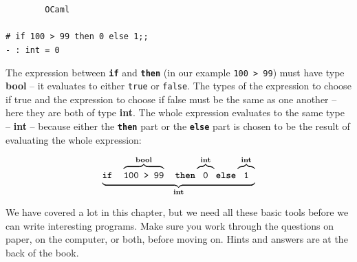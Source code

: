 \documentclass[]{book}
\newcommand{\smspace}{\vspace{4mm}}
\begin{document}
\smspace
\noindent\verb!        OCaml!\\
\noindent\\
\noindent\texttt{\# if 100 > 99 then 0 else 1;;}\\
\noindent\texttt{- :\ int = 0} 
\smspace

\noindent The expression between \texttt{\textbf{if}} and \texttt{\textbf{then}} (in our example \texttt{100 > 99}) must have type \textbf{\textrm{bool}} -- it evaluates to either \texttt{true} or \texttt{false}. The types of the expression to choose if true and the expression to choose if false must be the same as one another -- here they are both of type \textbf{\textrm{int}}. The whole expression evaluates to the same type -- \textbf{\textrm{int}} -- because either the \texttt{\textbf{then}} part or the \texttt{\textbf{else}} part is chosen to be the result of evaluating the whole expression:


\smspace
$$\underbrace{\vphantom{g}\texttt{\textbf{if}}\ \ \ \overbrace{\texttt{\strut 100 > 99}}^{\textbf{\textrm{bool}}}\ \ \ \texttt{\textbf{then}} \overbrace{\texttt{\strut 0}}^{\textbf{\textrm{int}}} \texttt{\textbf{else}} \overbrace{\texttt{\strut 1}}^{\textbf{\textrm{int}}}}_{\textrm{\textbf{int}}}$$
\smspace

\noindent We have covered a lot in this chapter, but we need all these basic tools before we can write interesting programs. Make sure you work through the questions on paper, on the computer, or both, before moving on. Hints and answers are at the back of the book.

\clearpage
\end{document}
